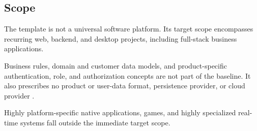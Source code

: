 \subsection{Scope}
\label{subsec:abgrenzung}

The template is not a universal software platform. Its target scope encompasses
recurring web, backend, and desktop projects, including full-stack business
applications.

Business rules, domain and customer data models, and product-specific
authentication, role, and authorization concepts are not part of the baseline.
It also prescribes no product or user-data format, persistence provider, or
cloud provider
\parencite{kleiveist2026architecture,kleiveist2026persistence}.

Highly platform-specific native applications, games, and highly specialized
real-time systems fall outside the immediate target scope.
